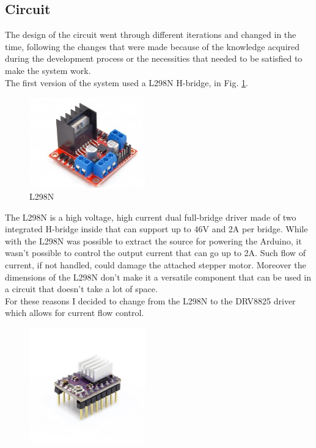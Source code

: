 \documentclass[a4paper,12pt]{article}
\begin{document}
\begin{multicols}{2}
\subsection{Circuit}
The design of the circuit went through different iterations and changed in the time, following the changes that were made because of the knowledge acquired during the development process or the necessities that needed to be satisfied to make the system work.\\
The first version of the system used a L298N H-bridge, in Fig. \ref{fig:l298n}.
\begin{figure}[H]
        \begin{center}
            \includegraphics[width=5cm]{images/l298n.jpg}
            \caption{L298N}
            \label{fig:l298n}
        \end{center}
    \end{figure}
The L298N is a high voltage, high current dual full-bridge driver made of two integrated H-bridge inside that can support up to 46V and 2A per bridge. While with the L298N was possible to extract the source for powering the Arduino, it wasn't possible to control the output current that can go up to 2A. Such flow of current, if not handled, could damage the attached stepper motor. Moreover the dimensions of the L298N don't make it a versatile component that can be used in a circuit that doesn't take a lot of space.\\
For these reasons I decided to change from the L298N to the DRV8825 driver which allows for current flow control.
\begin{figure}[H]
    \begin{center}
        \includegraphics[width=5cm]{images/drv8825.jpg}

\end{center}
\end{figure}
\end{multicols}
\end{document}
